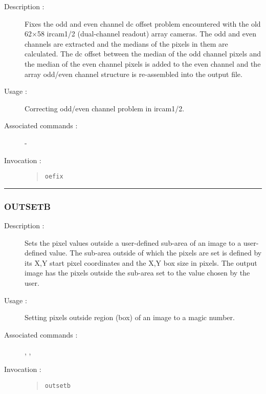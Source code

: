 \begin{description}

\item[Description :] Fixes the odd and even channel dc offset problem
encountered with the old 62$\times$58 {\sc ircam1/2} (dual-channel
readout) array cameras.  The odd and even channels are extracted and
the medians of the pixels in them are calculated.  The dc offset
between the median of the odd channel pixels and the median of the even
channel pixels is added to the even channel and the array odd/even
channel structure is re-assembled into the output file.

\item[Usage :] Correcting odd/even channel problem in {\sc ircam1/2}.
\item[Associated commands :] -
\item[Invocation :]

\begin{quote}{\tt  oefix }\end{quote}

\end{description}

\hrule
\subsubsection*{\label{OUTSETB}OUTSETB}

\begin{description}

\item[Description :] Sets the pixel values outside a user-defined
sub-area of an image to a user-defined value.  The sub-area outside of
which the pixels are set is defined by its X,Y start pixel coordinates
and the X,Y box size in pixels.  The output image has the pixels
outside the sub-area set to the value chosen by the user.

\item[Usage :] Setting pixels outside region (box) of an image to a
magic number.

\item[Associated commands :] {\tt {}},
{\tt {}}, {\tt {}}

\item[Invocation :]

\begin{quote}{\tt  outsetb }\end{quote}

\end{description}

